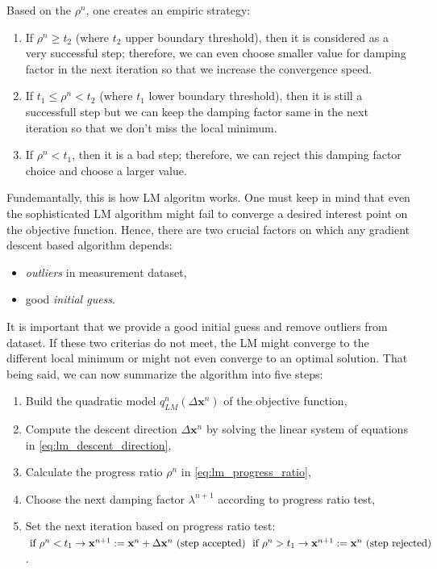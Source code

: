 \documentclass[a4paper]{report}
\numberwithin{figure}{section}
\begin{document}
Based on the $\rho^n$, one creates an empiric strategy:

\begin{enumerate}
  \item If $\rho^n \geq t_2$ (where $t_2$ upper boundary threshold), then it is considered as a very successful step; 
    therefore, we can even choose smaller value for damping factor in the next iteration 
    so that 
    we increase the convergence speed.
  \item If $t_1 \leq \rho^n < t_2$ (where $t_1$ lower boundary threshold), then it is still a successfull step but we 
    can keep the damping factor same in the next iteration so that we don't 
    miss the local minimum.
  \item If $\rho^n < t_1$, then it is a bad step; therefore, we can reject this 
    damping factor choice and choose a larger value.
\end{enumerate}

Fundemantally, this is how LM algoritm works. 
One must keep in mind that even the sophisticated LM algorithm might fail to 
converge a desired interest point on the objective function. Hence, 
there are two crucial factors on which any gradient descent based algorithm depends:
\begin{itemize}
  \item \textit{outliers} in measurement dataset,
  \item good \textit{initial guess}. 
\end{itemize}

It is important that we provide a good initial
guess and remove outliers from dataset. 
If these two criterias do not meet, the LM might converge to the
different local minimum or might not even converge to
an optimal solution. 
That being said, we can now summarize the algorithm into five steps:

\begin{enumerate}
  \item Build the quadratic model $q_{LM}^n(\Delta \mathbf{x}^n)$ of the objective function,
  \item Compute the descent direction $\Delta \mathbf{x}^n$ by solving the linear system of 
    equations in \eqref{eq:lm_descent_direction},
  \item Calculate the progress ratio $\rho^n$ in \eqref{eq:lm_progress_ratio},
  \item Choose the next damping factor $\lambda^{n+1}$ according to progress ratio test,
  \item Set the next iteration based on progress ratio test:
    $\\ \text{  if } \rho^n < t_1 \rightarrow \mathbf{x}^{n+1}:=\mathbf{x}^n +\Delta \mathbf{x}^n \text{ (step accepted) }\\ 
    \text{  if }\rho^n > t_1 \rightarrow \mathbf{x}^{n+1}:=\mathbf{x}^n \text{ (step rejected)}$.
\end{enumerate}
\end{document}
